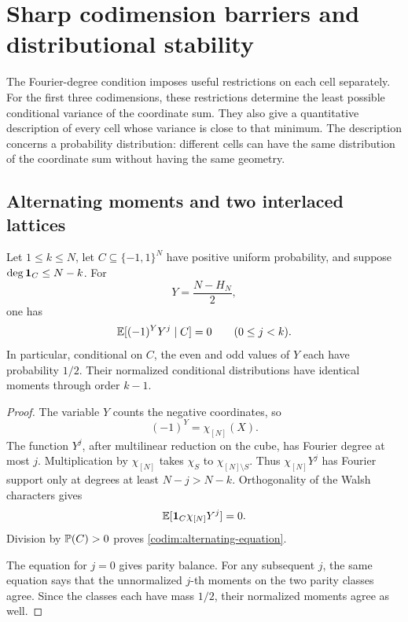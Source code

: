 \section{Sharp codimension barriers and distributional stability}
\label{codim:section}

The Fourier-degree condition imposes useful restrictions on each cell
separately.  For the first three codimensions, these restrictions determine
the least possible conditional variance of the coordinate sum.  They also
give a quantitative description of every cell whose variance is close to
that minimum.  The description concerns a probability distribution:
different cells can have the same distribution of the coordinate sum
without having the same geometry.

\subsection{Alternating moments and two interlaced lattices}

\begin{lemma}
\label{codim:alternating}
Let \(1\le k\le N\), let \(C\subseteq\{-1,1\}^N\) have positive
uniform probability, and suppose
\(\deg\mathbf 1_C\le N-k\).  For
\[
Y=\frac{N-H_N}{2},
\]
one has
\begin{equation}
\label{codim:alternating-equation}
\mathbb E[(-1)^Y Y^j\mid C]=0
\qquad(0\le j<k).
\end{equation}
In particular, conditional on \(C\), the even and odd values of \(Y\)
each have probability \(1/2\).  Their normalized conditional
distributions have identical moments through order \(k-1\).
\end{lemma}

\begin{proof}
The variable \(Y\) counts the negative coordinates, so
\[
(-1)^Y=\chi_{[N]}(X).
\]
The function \(Y^j\), after multilinear reduction on the cube, has
Fourier degree at most \(j\).  Multiplication by \(\chi_{[N]}\)
takes \(\chi_S\) to \(\chi_{[N]\setminus S}\).  Thus
\(\chi_{[N]}Y^j\) has Fourier support only at degrees at least
\(N-j>N-k\).  Orthogonality of the Walsh characters gives
\[
\mathbb E[\mathbf 1_C\chi_{[N]}Y^j]=0.
\]
Division by \(\mathbb P(C)>0\) proves
\eqref{codim:alternating-equation}.

The equation for \(j=0\) gives parity balance.  For any subsequent
\(j\), the same equation says that the unnormalized \(j\)-th moments
on the two parity classes agree.  Since the classes each have mass
\(1/2\), their normalized moments agree as well.
\end{proof}

